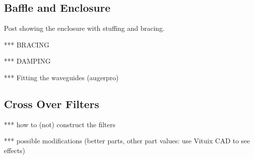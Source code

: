 \documentclass[12pt,a4paper]{article}
\begin{document}
\subsection{Baffle and Enclosure}

Post showing the enclosure with stuffing and bracing\cite{osmc_p930}.

*** BRACING

*** DAMPING

*** Fitting the waveguides (augerpro)


\subsection{Cross Over Filters}

*** how to (not) construct the filters

*** possible modifications (better parts, other part values: use Vituix CAD to see effects)
\end{document}
